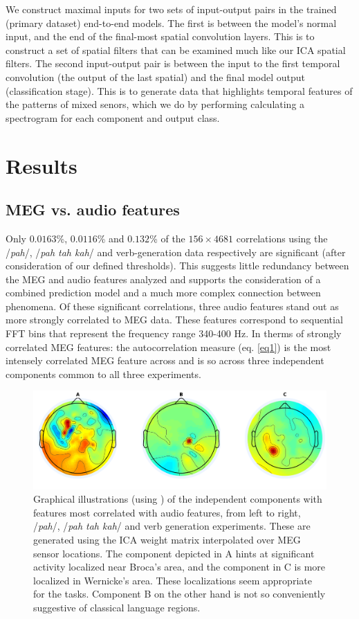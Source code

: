\documentclass[utf8]{frontiersSCNS} %
\begin{document}
We construct maximal inputs for two sets of input-output pairs in the trained (primary dataset) end-to-end models. The first is between the model's normal input, and the end of the final-most spatial convolution layers. This is to construct a set of spatial filters that can be examined much like our ICA spatial filters. The second input-output pair is between the input to the first temporal convolution (the output of the last spatial) and the final model output (classification stage). This is to generate data that highlights temporal features of the patterns of mixed senors, which we do by performing calculating a spectrogram for each component and output class.

\section{Results}

\subsection{MEG vs. audio features}

Only $0.0163$\%, $0.0116$\% and $0.132$\% of the $156 \times 4681$ correlations using the /{\em pah}/, /{\em pah tah kah}/ and verb-generation data respectively are significant (after consideration of our defined thresholds). This suggests little redundancy between the MEG and audio features analyzed and supports the consideration of a combined prediction model and a much more complex connection between phenomena. Of these significant correlations, three audio features stand out as more strongly correlated to MEG data. These features correspond to sequential FFT bins that represent the frequency range 340-400 Hz. In therms of strongly correlated MEG features: the autocorrelation measure (eq. \ref{eq1}) is the most intensely correlated MEG feature across and is so across three independent components common to all three experiments.

\begin{figure}[t]
  \centering
  \includegraphics[width=\linewidth]{AllComponents.png}
  \caption{Graphical illustrations (using \cite{Delorme04eeglab}) of the independent components with features most correlated with audio features, from left to right, /{\em pah}/, /{\em pah tah kah}/ and verb generation experiments. These are generated using the ICA weight matrix interpolated over MEG sensor locations. The component depicted in A hints at significant activity localized near Broca's area, and the component in C is more localized in Wernicke's area. These localizations seem appropriate for the tasks. Component B on the other hand is not so conveniently suggestive of classical language regions.}
  \label{fig:components}
\end{figure}
 
\end{document}
